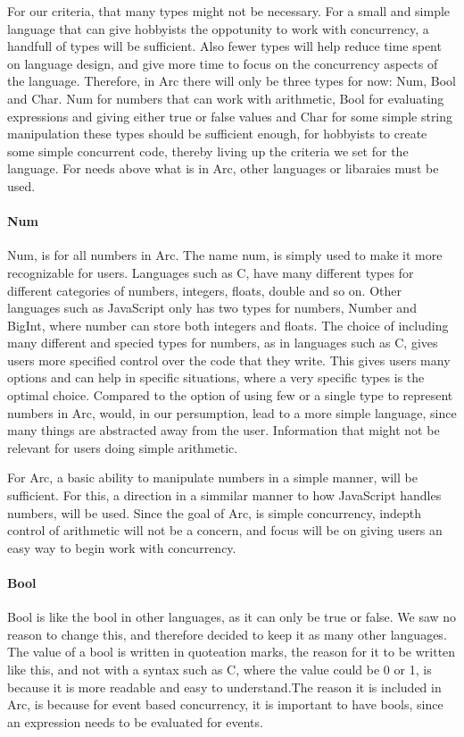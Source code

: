For our criteria, that many types might not be necessary. For a small and simple language that can give hobbyists the oppotunity to work with concurrency, a handfull of types will be sufficient. Also fewer types will help reduce time spent on language design, and give more time to focus on the concurrency aspects of the language. Therefore, in Arc there will only be three types for now: Num, Bool and Char. Num for numbers that can work with arithmetic, Bool for evaluating expressions and giving either true or false values and Char for some simple string manipulation these types should be sufficient enough, for hobbyists to create some simple concurrent code, thereby living up the criteria we set for the language. For needs above what is in Arc, other languages or libaraies must be used. 

\paragraph*{Num}
Num, is for all numbers in Arc. The name num, is simply used to make it more recognizable for users. Languages such as C, have many different types for different categories of numbers, integers, floats, double and so on. Other languages such as JavaScript only has two types for numbers, Number and BigInt, where number can store both integers and floats.
The choice of including many different and specied types for numbers, as in languages such as C, gives users more specified control over the code that they write. This gives users many options and can help in specific situations, where a very specific types is the optimal choice.
Compared to the option of using few or a single type to represent numbers in Arc, would, in our persumption, lead to a more simple language, since many things are abstracted away from the user. Information that might not be relevant for users doing simple arithmetic.

For Arc, a basic ability to manipulate numbers in a simple manner, will be sufficient. For this, a direction in a simmilar manner to how JavaScript handles numbers, will be used. Since the goal of Arc, is simple concurrency, indepth control of arithmetic will not be a concern, and focus will be on giving users an easy way to begin work with concurrency.

\paragraph*{Bool}
Bool is like the bool in other languages, as it can only be true or false. We saw no reason to change this, and therefore decided to keep it as many other languages. The value of a bool is written in quoteation marks, the reason for it to be written like this, and not with a syntax such as C, where the value could be 0 or 1, is because it is more readable and easy to understand.The reason it is included in Arc, is because for event based concurrency, it is important to have bools, since an expression needs to be evaluated for events.

